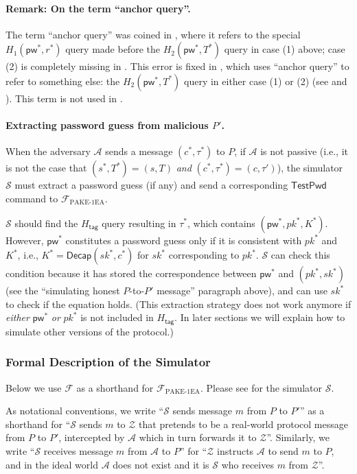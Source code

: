 \documentclass{article}
\theoremstyle{plain}
\theoremstyle{definition}
\theoremstyle{remark}
\newcommand{\adv}{\mathcal{A}}
\newcommand{\env}{\mathcal{Z}}
\renewcommand{\sim}{\mathcal{S}}
\newcommand{\func}{\mathcal{F}}
\newcommand{\Fpake}{\func_\mathrm{PAKE\text{-}1EA}}
\newcommand{\Decap}{\mathsf{Decap}}
\newcommand{\Htag}{H_\mathsf{tag}}
\newcommand{\pw}{\mathsf{pw}}
\newcommand{\TestPwd}{\mathsf{TestPwd}}
\begin{document}
\paragraph{Remark: On the term ``anchor query''.}
The term ``anchor query'' was coined in \cite[Section~3.3]{CCS:McQRosRoy20}, where it refers to the special $H_1(\pw^*,r^*)$ query made before the $H_2(\pw^*,T^*)$ query in case (1) above; case (2) is completely missing in \cite{CCS:McQRosRoy20}. This error is fixed in \cite{EC:JanRoyXu25}, which uses ``anchor query'' to refer to something else: the $H_2(\pw^*,T^*)$ query in either case (1) or (2) (see \cite[Section~4.3.1]{EC:JanRoyXu25} and \cite[Figure~11,~step~4]{EC:JanRoyXu25}). This term is not used in \cite{EPRINT:ArrBarJar25}.

\paragraph{Extracting password guess from malicious $P'$.}
When the adversary $\adv$ sends a message $(c^*,\tau^*)$ to $P$, if $\adv$ is not passive (i.e., it is not the case that $(s^*,T^*) = (s,T)$ \emph{and} $(c^*,\tau^*) = (c,\tau')$), the simulator $\sim$ must extract a password guess (if any) and send a corresponding $\TestPwd$ command to $\Fpake$.

$\sim$ should find the $\Htag$ query resulting in $\tau^*$, which contains $(\pw^*,pk^*,K^*)$. However, $\pw^*$ constitutes a password guess only if it is consistent with $pk^*$ and $K^*$, i.e., $K^* = \Decap(sk^*,c^*)$ for $sk^*$ corresponding to $pk^*$. $\sim$ can check this condition because it has stored the correspondence between $\pw^*$ and $(pk^*,sk^*)$ (see the ``simulating honest $P$-to-$P'$ message'' paragraph above), and can use $sk^*$ to check if the equation holds. (This extraction strategy does not work anymore if \emph{either} $\pw^*$ \emph{or} $pk^*$ is not included in $\Htag$. In later sections we will explain how to simulate other versions of the protocol.)

\subsubsection{Formal Description of the Simulator}
\label{sec:sim}

Below we use $\func$ as a shorthand for $\Fpake$. Please see  for the simulator $\sim$.

As notational conventions, we write ``$\sim$ sends message $m$ from $P$ to $P'$'' as a shorthand for ``$\sim$ sends $m$ to $\env$ that pretends to be a real-world protocol message from $P$ to $P'$, intercepted by $\adv$ which in turn forwards it to $\env$''. Similarly, we write ``$\sim$ receives message $m$ from $\adv$ to $P$'' for ``$\env$ instructs $\adv$ to send $m$ to $P$, and in the ideal world $\adv$ does not exist and it is $\sim$ who receives $m$ from $\env$''.
\end{document}
